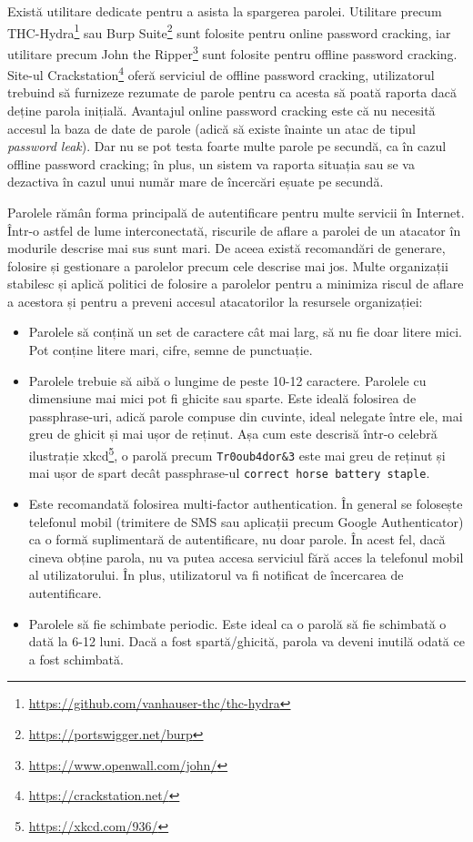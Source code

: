 Există utilitare dedicate pentru a asista la spargerea parolei.
Utilitare precum THC-Hydra\footnote{\url{https://github.com/vanhauser-thc/thc-hydra}} sau Burp Suite\footnote{\url{https://portswigger.net/burp}} sunt folosite pentru online password cracking, iar utilitare precum John the Ripper\footnote{\url{https://www.openwall.com/john/}} sunt folosite pentru offline password cracking.
Site-ul Crackstation\footnote{\url{https://crackstation.net/}} oferă serviciul de offline password cracking, utilizatorul trebuind să furnizeze rezumate de parole pentru ca acesta să poată raporta dacă deține parola inițială.
Avantajul online password cracking este că nu necesită accesul la baza de date de parole (adică să existe înainte un atac de tipul \textit{password leak}).
Dar nu se pot testa foarte multe parole pe secundă, ca în cazul offline password cracking;
în plus, un sistem va raporta situația sau se va dezactiva în cazul unui număr mare de încercări eșuate pe secundă.

Parolele rămân forma principală de autentificare pentru multe servicii în Internet.
Într-o astfel de lume interconectată, riscurile de aflare a parolei de un atacator în modurile descrise mai sus sunt mari.
De aceea există recomandări de generare, folosire și gestionare a parolelor precum cele descrise mai jos.
Multe organizații stabilesc și aplică politici de folosire a parolelor pentru a minimiza riscul de aflare a acestora și pentru a preveni accesul atacatorilor la resursele organizației:

\begin{itemize}
  \item Parolele să conțină un set de caractere cât mai larg, să nu fie doar litere mici.
    Pot conține litere mari, cifre, semne de punctuație.
  \item Parolele trebuie să aibă o lungime de peste 10-12 caractere.
    Parolele cu dimensiune mai mici pot fi ghicite sau sparte.
    Este ideală folosirea de passphrase-uri, adică parole compuse din cuvinte, ideal nelegate între ele, mai greu de ghicit și mai ușor de reținut.
    Așa cum este descrisă într-o celebră ilustrație xkcd\footnote{\url{https://xkcd.com/936/}}, o parolă precum \texttt{Tr0oub4dor\&3} este mai greu de reținut și mai ușor de spart decât passphrase-ul \texttt{correct horse battery staple}.
  \item Este recomandată folosirea multi-factor authentication.
    În general se folosește telefonul mobil (trimitere de SMS sau aplicații precum Google Authenticator) ca o formă suplimentară de autentificare, nu doar parole.
    În acest fel, dacă cineva obține parola, nu va putea accesa serviciul fără acces la telefonul mobil al utilizatorului.
    În plus, utilizatorul va fi notificat de încercarea de autentificare.
  \item Parolele să fie schimbate periodic.
    Este ideal ca o parolă să fie schimbată o dată la 6-12 luni.
    Dacă a fost spartă/ghicită, parola va deveni inutilă odată ce a fost schimbată.
\end{itemize}

